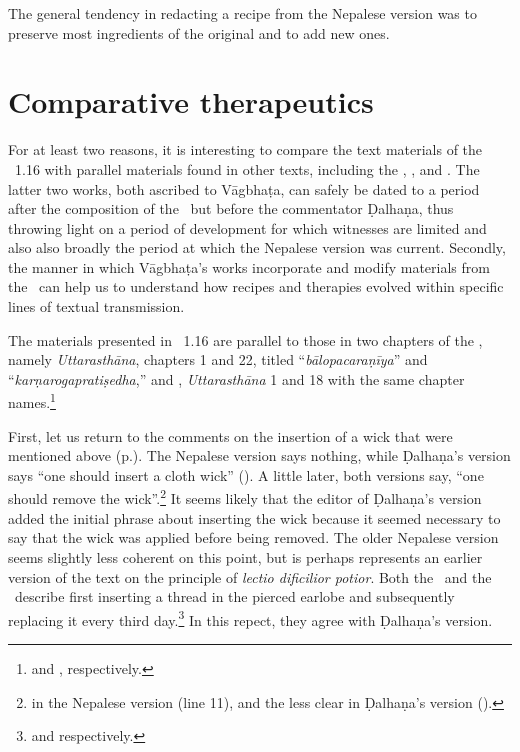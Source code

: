  The general tendency in redacting a recipe from the Nepalese version was to
preserve most ingredients of the original and to add new ones.
    

\section{Comparative therapeutics} 

For at least two reasons, it is interesting to compare the text materials of the
\SS~1.16 with parallel materials found in other texts, including the \CS,  \AS,
and \AHS. The latter two works, both ascribed to Vāgbhaṭa, can safely be dated
to a period after the composition of the \SS\ but before the commentator Ḍalhaṇa,
thus throwing light on a period of development for which witnesses are limited and
also also broadly the period at which the Nepalese version was current. Secondly,
the manner in which Vāgbhaṭa's works incorporate and modify materials from the
\SS\ can help us to understand how recipes and therapies evolved within specific
lines of textual transmission.

The materials presented in \SS~1.16 are parallel to those in two chapters of the
\AS, namely \emph{Uttarasthāna}, chapters 1 and 22, titled “\emph{bālopacaraṇīya}” 
and
“\emph{karṇarogapratiṣedha},” and \AHS, \emph{Uttarasthāna} 1 and 18 with the
same chapter
names.\footnote{\cite[619--629 and 734--744]{atha-1980} and \cite[777--781 and  
837--841]{kunt-1939}, respectively.}

First, let us return to the comments on the insertion of a wick that were
mentioned above (p.\pageref{wick}). %
The Nepalese version says nothing, while Ḍalhaṇa's version says “one should
insert a cloth wick” ().  A little later, both
versions say, “one should remove the wick”.\footnote{ in the Nepalese version (line 11), and the less clear
     in Ḍalhaṇa's version ().}  It
    seems likely that the editor of Ḍalhaṇa's version added the initial phrase
    about inserting the wick because it seemed necessary to say that the wick
    was applied before being removed.  The older Nepalese version seems slightly
    less coherent on this point, but is perhaps represents an earlier version of
    the text on the principle of \emph{lectio dificilior potior}. %
    Both the \AS\ and the \AHS\ describe first inserting a thread in the
    pierced earlobe and subsequently replacing it every third
    day.\footnote{ and  respectively.} In
        this repect, they agree  with Ḍalhaṇa’s version.

